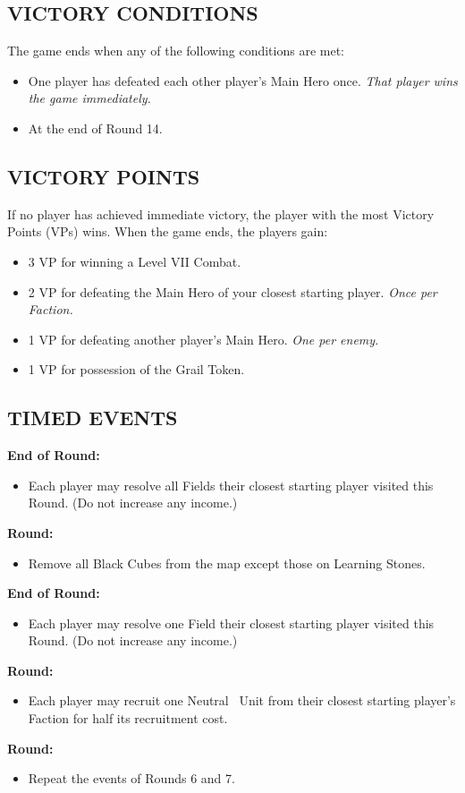 \begin{multicols*}{2}
\subsection*{\MakeUppercase{Victory Conditions}}
The game ends when any of the following conditions are met:
\begin{itemize}
  \item One player has defeated each other player's Main Hero once. \textit{That player wins the game immediately.}
  \item At the end of Round 14.
\end{itemize}

\subsection*{\MakeUppercase{Victory Points}}
If no player has achieved immediate victory, the player with the most Victory Points (VPs) wins. When the game ends, the players gain:
\begin{itemize}
  \item 3 VP for winning a Level VII Combat.
  \item 2 VP for defeating the Main Hero of your closest starting player. \textit{Once per Faction.}
  \item 1 VP for defeating another player's Main Hero. \textit{One per enemy.}
  \item 1 VP for possession of the Grail Token.
\end{itemize}

\subsection*{\MakeUppercase{Timed Events}}
\textbf{End of  Round:}
\begin{itemize}
  \item Each player may resolve all Fields their closest starting player visited this Round. (Do not increase any income.)
\end{itemize}
\textbf{ Round:}
\begin{itemize}
  \item Remove all Black Cubes from the map except those on Learning Stones.
\end{itemize}
\textbf{End of  Round:}
\begin{itemize}
  \item Each player may resolve one Field their closest starting player visited this Round. (Do not increase any income.)
\end{itemize}
\textbf{ Round:}
\begin{itemize}
  \item Each player may recruit one Neutral \silver\ Unit from their closest starting player's Faction for half its recruitment cost.
\end{itemize}
\textbf{ Round:}
\begin{itemize}
  \item Repeat the events of Rounds 6 and 7.
\end{itemize}


\end{multicols*}
